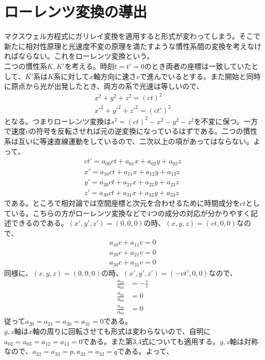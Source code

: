 \documentclass{jsarticle}
\begin{document}
    \section{ローレンツ変換の導出}
        マクスウェル方程式にガリレイ変換を適用すると形式が変わってしまう。そこで新たに相対性原理と光速度不変の原理を満たすような慣性系間の変換を考えなければならない。これをローレンツ変換という。\\
        二つの慣性系$K,K'$を考える。時刻$t=t'=0$のとき両者の座標は一致していたとして、$K'$系は$K$系に対して$x$軸方向に速さ$v$で進んでいるとする。また開始と同時に原点から光が出発したとき、両方の系で光速は等しいので、
        \begin{align*}
            x^2+y^2+z^2 = (ct)^2\\
            x'^2+y'^2+z'^2 = (ct')^2
        \end{align*}
        となる。つまりローレンツ変換は$s^2=(ct)^2-x^2-y^2-z^2$を不変に保つ。一方で速度$v$の符号を反転させれば元の逆変換になっているはずである。二つの慣性系は互いに等速直線運動をしているので、二次以上の項があってはならない。よって、
        \begin{align*}
            ct' = a_{00}ct + a_{01}x + a_{02}y + a_{03}z\\
            x' = a_{10}ct + a_{11}x + a_{12}y + a_{13}z\\
            y' = a_{20}ct + a_{21}x + a_{22}y + a_{23}z\\
            z' = a_{30}ct + a_{31}x + a_{32}y + a_{33}z
        \end{align*}
        である。ところで相対論では空間座標と次元を合わせるために時間成分を$ct$としている。こちらの方がローレンツ変換などで4つの成分の対応が分かりやすく記述できるのである。$(x',y',z')=(0,0,0)の時、(x,y,z)=(vt,0,0)$なので、
        \begin{align*}
            a_{10}c+a_{11}v = 0\\
            a_{20}c+a_{21}v = 0\\
            a_{30}c+a_{31}v = 0
        \end{align*}
        同様に、$(x,y,z)=(0,0,0)の時、(x',y',z')=(-vt',0,0)$なので、
        \begin{align*}
            \frac{a_{10}}{a_{00}} &= -\frac{v}{c}\\
            \frac{a_{20}}{a_{00}} &= 0\\
            \frac{a_{30}}{a_{00}} &= 0
        \end{align*}
        従って$a_{20}=a_{21}=a_{30}=a_{31}=0$である。\\$y,z$軸は$x$軸の周りに回転させても形式は変わらないので、自明に$a_{02}=a_{03}=a_{12}=a_{13}=0$である。また第3,4式についても適用する。$y,z$軸は対称なので、$a_{22}=a_{33}=p,a_{23}=a_{32}=q$である。よって、
\end{document}
